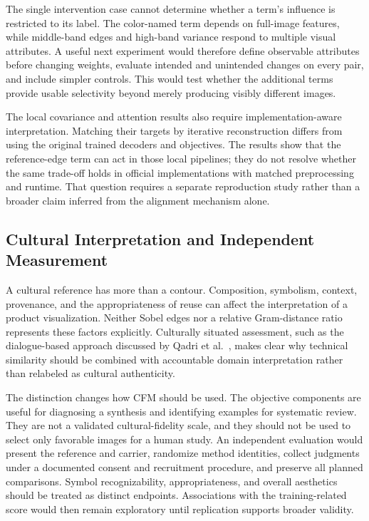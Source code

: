 The single intervention case cannot determine whether a term's influence is restricted to its label. The color-named term depends on full-image features, while middle-band edges and high-band variance respond to multiple visual attributes. A useful next experiment would therefore define observable attributes before changing weights, evaluate intended and unintended changes on every pair, and include simpler controls. This would test whether the additional terms provide usable selectivity beyond merely producing visibly different images.

The local covariance and attention results also require implementation-aware interpretation. Matching their targets by iterative reconstruction differs from using the original trained decoders and objectives. The results show that the reference-edge term can act in those local pipelines; they do not resolve whether the same trade-off holds in official implementations with matched preprocessing and runtime. That question requires a separate reproduction study rather than a broader claim inferred from the alignment mechanism alone.

\subsection{Cultural Interpretation and Independent Measurement}
A cultural reference has more than a contour. Composition, symbolism, context, provenance, and the appropriateness of reuse can affect the interpretation of a product visualization. Neither Sobel edges nor a relative Gram-distance ratio represents these factors explicitly. Culturally situated assessment, such as the dialogue-based approach discussed by Qadri et al.~\cite{qadri2024}, makes clear why technical similarity should be combined with accountable domain interpretation rather than relabeled as cultural authenticity.

The distinction changes how CFM should be used. The objective components are useful for diagnosing a synthesis and identifying examples for systematic review. They are not a validated cultural-fidelity scale, and they should not be used to select only favorable images for a human study. An independent evaluation would present the reference and carrier, randomize method identities, collect judgments under a documented consent and recruitment procedure, and preserve all planned comparisons. Symbol recognizability, appropriateness, and overall aesthetics should be treated as distinct endpoints. Associations with the training-related score would then remain exploratory until replication supports broader validity.

